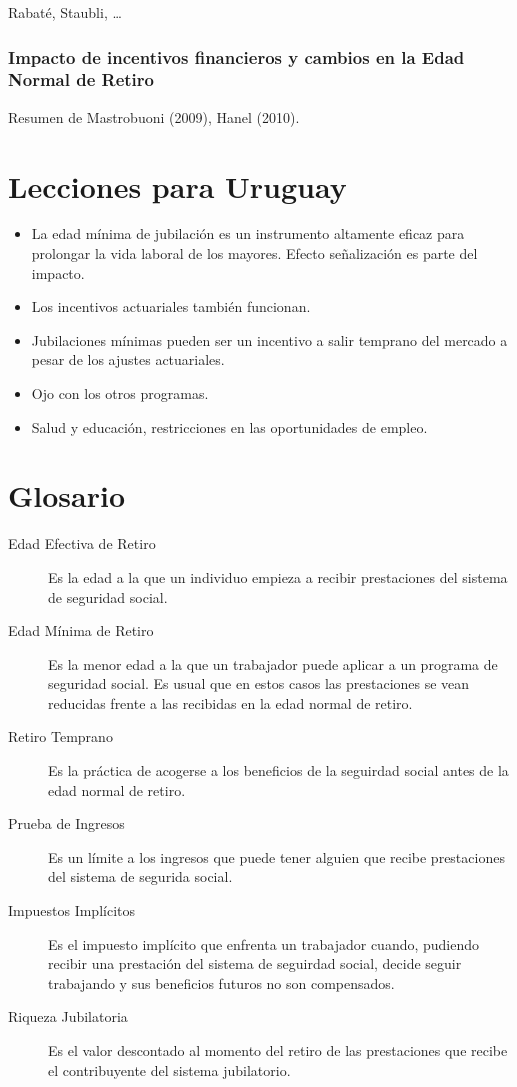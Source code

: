 \documentclass[]{article}
\providecommand{\tightlist}{%
  \setlength{\itemsep}{0pt}\setlength{\parskip}{0pt}}
\begin{document}
Rabaté, Staubli, \ldots{}

\subsubsection{Impacto de incentivos financieros y cambios en la Edad
Normal de
Retiro}\label{impacto-de-incentivos-financieros-y-cambios-en-la-edad-normal-de-retiro}

Resumen de Mastrobuoni (2009), Hanel (2010).

\section{Lecciones para Uruguay}\label{lecciones-para-uruguay}

\begin{itemize}
\tightlist
\item
  La edad mínima de jubilación es un instrumento altamente eficaz para
  prolongar la vida laboral de los mayores. Efecto señalización es parte
  del impacto.
\item
  Los incentivos actuariales también funcionan.
\item
  Jubilaciones mínimas pueden ser un incentivo a salir temprano del
  mercado a pesar de los ajustes actuariales.
\item
  Ojo con los otros programas.
\item
  Salud y educación, restricciones en las oportunidades de empleo.
\end{itemize}

\section{Glosario}\label{glosario}

\begin{description}
\item[Edad Efectiva de Retiro]
Es la edad a la que un individuo empieza a recibir prestaciones del
sistema de seguridad social.
\item[Edad Mínima de Retiro]
Es la menor edad a la que un trabajador puede aplicar a un programa de
seguridad social. Es usual que en estos casos las prestaciones se vean
reducidas frente a las recibidas en la edad normal de retiro.
\item[Retiro Temprano]
Es la práctica de acogerse a los beneficios de la seguirdad social antes
de la edad normal de retiro.
\item[Prueba de Ingresos]
Es un límite a los ingresos que puede tener alguien que recibe
prestaciones del sistema de segurida social.
\item[Impuestos Implícitos]
Es el impuesto implícito que enfrenta un trabajador cuando, pudiendo
recibir una prestación del sistema de seguirdad social, decide seguir
trabajando y sus beneficios futuros no son compensados.
\item[Riqueza Jubilatoria]
Es el valor descontado al momento del retiro de las prestaciones que
recibe el contribuyente del sistema jubilatorio.
\end{description}
\end{document}
